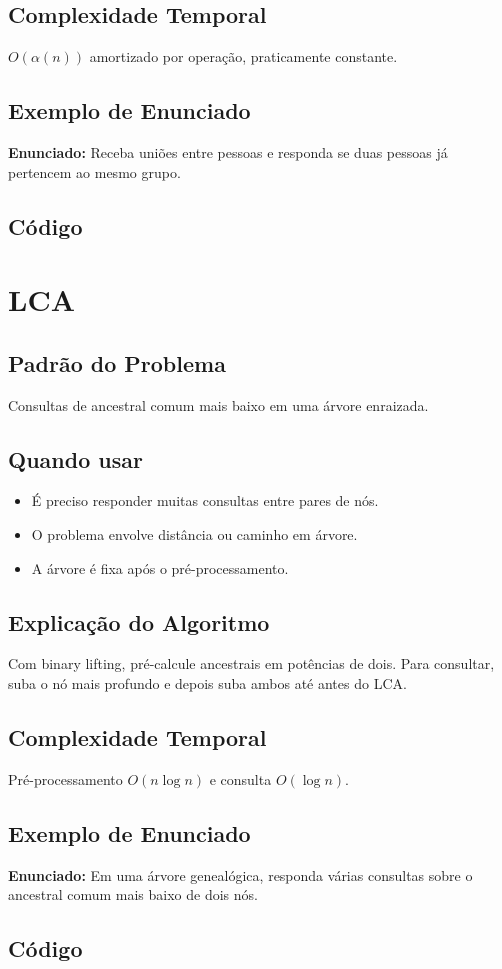 \subsection{Complexidade Temporal}
$O(\alpha(n))$ amortizado por operação, praticamente constante.

\subsection{Exemplo de Enunciado}
\begin{exemplodiabox}
\textbf{Enunciado:} Receba uniões entre pessoas e responda se duas pessoas já pertencem ao mesmo grupo.
\end{exemplodiabox}

\subsection{Código}

\section{LCA}

\subsection{Padrão do Problema}
Consultas de ancestral comum mais baixo em uma árvore enraizada.

\subsection{Quando usar}
\begin{itemize}[nosep]
  \item É preciso responder muitas consultas entre pares de nós.
  \item O problema envolve distância ou caminho em árvore.
  \item A árvore é fixa após o pré-processamento.
\end{itemize}

\subsection{Explicação do Algoritmo}
Com binary lifting, pré-calcule ancestrais em potências de dois. Para consultar, suba o nó mais profundo e depois suba ambos até antes do LCA.

\subsection{Complexidade Temporal}
Pré-processamento $O(n \log n)$ e consulta $O(\log n)$.

\subsection{Exemplo de Enunciado}
\begin{exemplodiabox}
\textbf{Enunciado:} Em uma árvore genealógica, responda várias consultas sobre o ancestral comum mais baixo de dois nós.
\end{exemplodiabox}

\subsection{Código}
